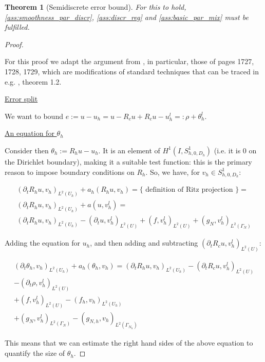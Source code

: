 \documentclass[english,a4paper,9pt,oneside]{scrbook}	%
\theoremstyle{break}
\newtheorem{thm}[equation]{Theorem}
\newenvironment{mproof}[1][\proofname]{%
  \begin{proof}[#1]$ $\par\nobreak\ignorespaces
}{%
  \end{proof}
}
\renewcommand*{\proofname}{Proof}
\theoremstyle{remark}
\newcommand{\ind}[1]{\{\text{ #1 }\}}
\begin{document}
\begin{appendices}
\begin{thm}[Semidiscrete error bound]
For this to hold, \cref{ass:smoothness_par_discr}, \cref{ass:discr_reg} and \cref{ass:basic_par_mix} must be fulfilled.

\end{thm}

\begin{mproof}

For this proof we adapt the argument from \cite{ranner}, in particular, those of pages 1727, 1728, 1729, which are modifications of standard techniques that can be traced in e.g. \cite{thomee}, theorem 1.2.

\underline{Error split}

We want to bound $e:=u-u_h = u-R_cu +R_c u -u_h^l =: \rho + \theta_h^l$.

\underline{An equation for $\theta_h$}

Consider then $\theta_h := R_h u -u_h$. It is an element of $H^1(I,S^1_{h,0,D_h})$ (i.e. it is $0$ on the Dirichlet boundary), making it a suitable test function: this is the primary reason to impose boundary conditions on $R_h$.
So, we have, for $v_h \in S^1_{h,0,D_h}$:

\begin{align*}
(\partial_t R_h u , v_h)_{L^2(U_h)} + a_h(R_h u, v_h) = \ind{definition of Ritz projection}=\\
(\partial_t R_h u , v_h)_{L^2(U_h)} + a(u, v_h^l) =\\
(\partial_t R_h u , v_h)_{L^2(U_h)} - (\partial_t u, v_h^l)_{L^2(U)} + (f, v_h^l)_{L^2(U)} + (g_{N}, v_h^l)_{L^2(\Gamma_{N})} 
\end{align*}

Adding the equation for $u_h$, and then adding and subtracting $(\partial_t R_cu, v_h^l)_{L^2(U)}$:


\begin{align}
\label{eqn:theta}
(\partial_t \theta_h , v_h)_{L^2(U_h)} + a_h(\theta_h, v_h) = 
(\partial_t R_h u , v_h)_{L^2(U_h)} - (\partial_t R_c u , v_h^l)_{L^2(U)}\\
- (\partial_t \rho, v_h^l)_{L^2(U)}\\ + (f, v_h^l)_{L^2(U)} - (f_h, v_h)_{L^2(U_h)}\\ + (g_{N}, v_h^l)_{L^2(\Gamma_{N})} - (g_{N,h}, v_h)_{L^2(\Gamma_{N_h})} 
\end{align}

This means that we can estimate the right hand sides of the above equation to quantify the size of $\theta_h$.


\end{mproof}
\end{appendices}
\end{document}
